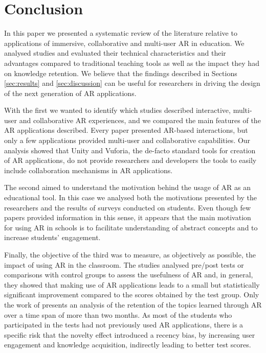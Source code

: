 \section{Conclusion} \label{sec:conclusion}
In this paper we presented a systematic review of the literature relative to applications of immersive, collaborative and multi-user \gls{AR} in education. We analysed \papersSelected studies and evaluated their technical characteristics and their advantages compared to traditional teaching tools as well as the impact they had on knowledge retention. We believe that the findings described in Sections \ref{sec:results} and \ref{sec:discussion} can be useful for researchers in driving the design of the next generation of AR applications.

With the first  we wanted to identify which studies described interactive, multi-user and collaborative AR experiences, and we compared the main features of the AR applications described. Every paper presented AR-based interactions, but only a few applications provided multi-user and collaborative capabilities. Our analysis showed that Unity and Vuforia, the de-facto standard tools for creation of \gls{AR} applications, do not provide researchers and developers the tools to easily include collaboration mechanisms in \gls{AR} applications.

The second  aimed to understand the motivation behind the usage of \gls{AR} as an educational tool. In this case we analysed both the motivations presented by the researchers and the results of surveys conducted on students. Even though few papers provided information in this sense, it appears that the main motivation for using \gls{AR} in schools is to facilitate understanding of abstract concepts and to increase students' engagement.

Finally, the objective of the third  was to measure, as objectively as possible, the impact of using \gls{AR} in the classroom. The studies analysed pre/post tests or comparisons with control groups to assess the usefulness of \gls{AR} and, in general, they showed that making use of \gls{AR} applications leads to a small but statistically significant improvement compared to the scores obtained by the test group. Only the work of \citet{lin2016effect} presents an analysis of the retention of the topics learned through \gls{AR} over a time span of more than two months. As most of the students who participated in the tests had not previously used \gls{AR} applications, there is a specific risk that the novelty effect introduced a recency bias, by increasing user engagement and knowledge acquisition, indirectly leading to better test scores.  

